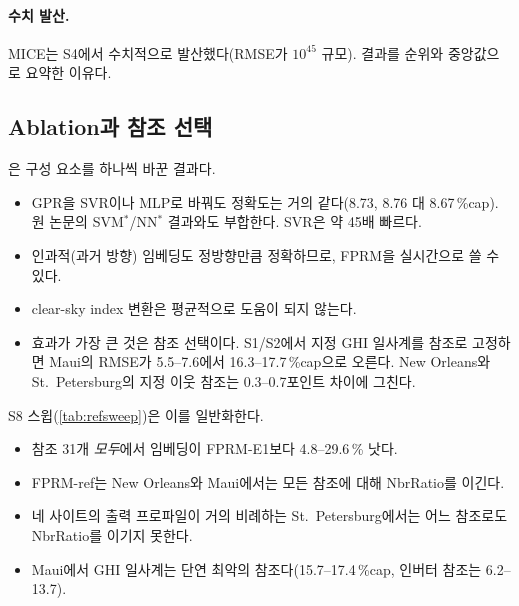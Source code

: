 \documentclass[11pt,a4paper]{article}
\newcommand{\tabdir}{../tables/ko}
\newcommand{\pct}{\,\%}
\begin{document}
\paragraph{수치 발산.}
MICE는 S4에서 수치적으로 발산했다(RMSE가 $10^{45}$ 규모).
결과를 순위와 중앙값으로 요약한 이유다.

\subsection{Ablation과 참조 선택}\label{sec:ablation}

은 구성 요소를 하나씩 바꾼 결과다.
\begin{itemize}
  \item GPR을 SVR이나 MLP로 바꿔도 정확도는 거의 같다(8.73, 8.76 대 8.67\pct{}cap). 원 논문의 SVM$^*$/NN$^*$ 결과와도 부합한다. SVR은 약 45배 빠르다.
  \item 인과적(과거 방향) 임베딩도 정방향만큼 정확하므로, FPRM을 실시간으로 쓸 수 있다.
  \item clear-sky index 변환은 평균적으로 도움이 되지 않는다.
  \item 효과가 가장 큰 것은 참조 선택이다. S1/S2에서 지정 GHI 일사계를 참조로 고정하면 Maui의 RMSE가 5.5--7.6에서 16.3--17.7\pct{}cap으로 오른다. New Orleans와 St.\ Petersburg의 지정 이웃 참조는 0.3--0.7포인트 차이에 그친다.
\end{itemize}

S8 스윕(\cref{tab:refsweep})은 이를 일반화한다.
\begin{itemize}
  \item 참조 31개 \emph{모두}에서 임베딩이 FPRM-E1보다 4.8--29.6\pct{} 낫다.
  \item FPRM-ref는 New Orleans와 Maui에서는 모든 참조에 대해 NbrRatio를 이긴다.
  \item 네 사이트의 출력 프로파일이 거의 비례하는 St.\ Petersburg에서는 어느 참조로도 NbrRatio를 이기지 못한다.
  \item Maui에서 GHI 일사계는 단연 최악의 참조다(15.7--17.4\pct{}cap, 인버터 참조는 6.2--13.7).
\end{itemize}

\begin{table}[t]
  \centering\small
  \caption{FPRM ablation(S1 $r\in\{0.5,0.9\}$, S2 $L\in\{6,24\}$\,h, S6 $r\in\{0.5,0.9\}$; 데이터셋 4개, seed 3개). RMSE는 \%cap, 시간은 결측 시계열당 학습+예측 시간(CPU 1코어). $^\dagger$: 원 논문에 없음.}
  \label{tab:ablation}
  
\end{table}
\end{document}
